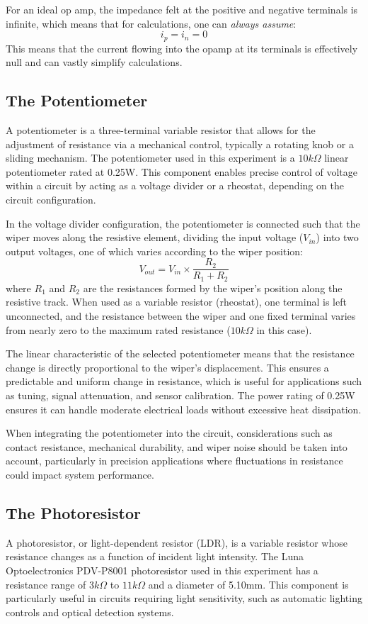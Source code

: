 \documentclass[12pt]{article}
\begin{document}
For an ideal op amp, the impedance felt at the positive and negative terminals
is infinite, which means that for calculations, one can \textit{always assume}:
\[
	i_p = i_n = 0
\]
This means that the current flowing into the opamp at its terminals is
effectively null and can vastly simplify calculations.

\subsection{The Potentiometer}
A potentiometer is a three-terminal variable resistor that allows for the
adjustment of resistance via a mechanical control, typically a rotating knob or
a sliding mechanism. The potentiometer used in this experiment is a \(10k\Omega\)
linear potentiometer rated at 0.25W. This component
enables precise control of voltage within a circuit by acting as a voltage
divider or a rheostat, depending on the circuit configuration.

In the voltage divider configuration, the potentiometer is connected such that the wiper moves along the resistive element, dividing the input voltage (\(V_{in}\)) into two output voltages, one of which varies according to the wiper position:
\[
	V_{out} = V_{in} \times \frac{R_2}{R_1 + R_2}
\]
where \( R_1 \) and \( R_2 \) are the resistances formed by the wiper's position
along the resistive track. When used as a variable resistor (rheostat), one
terminal is left unconnected, and the resistance between the wiper and one fixed
terminal varies from nearly zero to the maximum rated resistance (\(10k\Omega\) in this case).

The linear characteristic of the selected potentiometer means that the resistance change is directly proportional to the wiper’s displacement. This ensures a predictable and uniform change in resistance, which is useful for applications such as tuning, signal attenuation, and sensor calibration. The power rating of 0.25W ensures it can handle moderate electrical loads without excessive heat dissipation.

When integrating the potentiometer into the circuit, considerations such as contact resistance, mechanical durability, and wiper noise should be taken into account, particularly in precision applications where fluctuations in resistance could impact system performance.

\subsection{The Photoresistor}
A photoresistor, or light-dependent resistor (LDR), is a variable resistor whose
resistance changes as a function of incident light intensity. The Luna
Optoelectronics PDV-P8001 photoresistor used in this experiment has a resistance
range of \(3k\Omega\) to \(11k\Omega\) and a diameter of 5.10mm. This component is particularly
useful in circuits requiring light sensitivity, such as automatic lighting
controls and optical detection systems.
\end{document}
